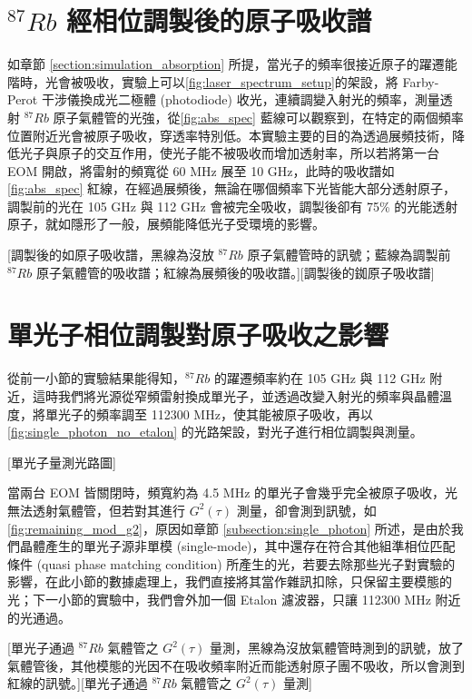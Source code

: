 \documentclass[class=NCU_thesis, crop=false]{standalone}
\begin{document}
\section{$^{87}Rb$ 經相位調製後的原子吸收譜}

如章節 \ref{section:simulation_absorption} 所提，當光子的頻率很接近原子的躍遷能階時，光會被吸收，實驗上可以\cref{fig:laser_spectrum_setup}的架設，將 Farby-Perot 干涉儀換成光二極體 (photodiode) 收光，連續調變入射光的頻率，測量透射 $^{87}Rb$ 原子氣體管的光強，從\cref{fig:abs_spec} 藍線可以觀察到，在特定的兩個頻率位置附近光會被原子吸收，穿透率特別低。本實驗主要的目的為透過展頻技術，降低光子與原子的交互作用，使光子能不被吸收而增加透射率，所以若將第一台 EOM 開啟，將雷射的頻寬從 60 MHz 展至 10 GHz，此時的吸收譜如\cref{fig:abs_spec} 紅線，在經過展頻後，無論在哪個頻率下光皆能大部分透射原子，調製前的光在 105 GHz 與 112 GHz 會被完全吸收，調製後卻有 75\% 的光能透射原子，就如隱形了一般，展頻能降低光子受環境的影響。

[調製後的如原子吸收譜，黑線為沒放 $^{87}Rb$ 原子氣體管時的訊號；藍線為調製前 $^{87}Rb$ 原子氣體管的吸收譜；紅線為展頻後的吸收譜。][調製後的銣原子吸收譜]

\section{單光子相位調製對原子吸收之影響}
從前一小節的實驗結果能得知，$^{87}Rb$ 的躍遷頻率約在 105 GHz 與 112 GHz 附近，這時我們將光源從窄頻雷射換成單光子，並透過改變入射光的頻率與晶體溫度，將單光子的頻率調至 112300 MHz，使其能被原子吸收，再以\cref{fig:single_photon_no_etalon} 的光路架設，對光子進行相位調製與測量。

[單光子量測光路圖]

當兩台 EOM 皆關閉時，頻寬約為 4.5 MHz 的單光子會幾乎完全被原子吸收，光無法透射氣體管，但若對其進行 $G^{2}(\tau)$ 測量，卻會測到訊號，如\cref{fig:remaining_mod_g2}，原因如章節 \ref{subsection:single_photon} 所述，是由於我們晶體產生的單光子源非單模 (single-mode)，其中還存在符合其他組準相位匹配條件 (quasi phase matching condition) 所產生的光，若要去除那些光子對實驗的影響，在此小節的數據處理上，我們直接將其當作雜訊扣除，只保留主要模態的光；下一小節的實驗中，我們會外加一個 Etalon 濾波器，只讓 112300 MHz 附近的光通過。

[單光子通過 $^{87}Rb$ 氣體管之 $G^{2}(\tau)$ 量測，黑線為沒放氣體管時測到的訊號，放了氣體管後，其他模態的光因不在吸收頻率附近而能透射原子團不吸收，所以會測到紅線的訊號。][單光子通過 $^{87}Rb$ 氣體管之 $G^{2}(\tau)$ 量測]
\end{document}
